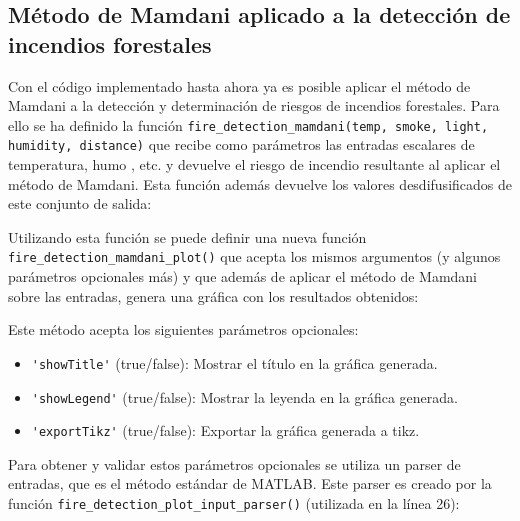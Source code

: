 \lstset{linewidth=18cm}

\lstset{linewidth=\textwidth}
\subsection{Método de Mamdani aplicado a la detección de incendios forestales}
Con el código implementado hasta ahora ya es posible aplicar el método de Mamdani a la detección y determinación de riesgos de incendios forestales. Para ello se ha definido la función \lstinline|fire_detection_mamdani(temp, smoke, light, humidity, distance)| que recibe como parámetros las entradas escalares de temperatura, humo , etc. y devuelve el riesgo de incendio resultante al aplicar el método de Mamdani. Esta función además devuelve los valores desdifusificados de este conjunto de salida:



Utilizando esta función se puede definir una nueva función \lstinline|fire_detection_mamdani_plot()| que acepta los mismos argumentos (y algunos parámetros opcionales más) y que además de aplicar el método de Mamdani sobre las entradas, genera una gráfica con los resultados obtenidos:



Este método acepta los siguientes parámetros opcionales:

\begin{itemize}
\item \lstinline|'showTitle'| (true/false): Mostrar el título en la gráfica generada.
\item \lstinline|'showLegend'| (true/false): Mostrar la leyenda en la gráfica generada.
\item \lstinline|'exportTikz'| (true/false): Exportar la gráfica generada a tikz.
\end{itemize} 

Para obtener y validar estos parámetros opcionales se utiliza un parser de entradas, que es el método estándar de MATLAB. Este parser es creado por la función \lstinline|fire_detection_plot_input_parser()| (utilizada en la línea 26):

